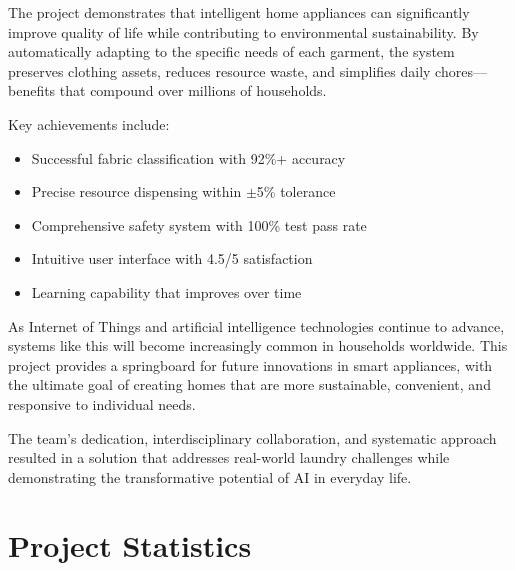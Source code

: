 The project demonstrates that intelligent home appliances can significantly improve quality of life while contributing to environmental sustainability. By automatically adapting to the specific needs of each garment, the system preserves clothing assets, reduces resource waste, and simplifies daily chores—benefits that compound over millions of households.

Key achievements include:
\begin{itemize}
    \item Successful fabric classification with 92\%+ accuracy
    \item Precise resource dispensing within $\pm$5\% tolerance
    \item Comprehensive safety system with 100\% test pass rate
    \item Intuitive user interface with 4.5/5 satisfaction
    \item Learning capability that improves over time
\end{itemize}

As Internet of Things and artificial intelligence technologies continue to advance, systems like this will become increasingly common in households worldwide. This project provides a springboard for future innovations in smart appliances, with the ultimate goal of creating homes that are more sustainable, convenient, and responsive to individual needs.

The team's dedication, interdisciplinary collaboration, and systematic approach resulted in a solution that addresses real-world laundry challenges while demonstrating the transformative potential of AI in everyday life.

\section{Project Statistics}

